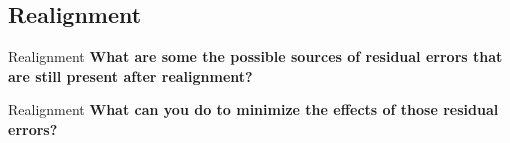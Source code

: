 \documentclass{beamer}
\begin{document}

\subsection[Realignment]{Realignment}

\begin{frame}{Realignment}
  \textbf{What are some the possible sources of residual errors that are still present after realignment?}

  
\end{frame}


\begin{frame}{Realignment}
  \textbf{What can you do to minimize the effects of those residual errors?}

\end{frame}
\end{document}
